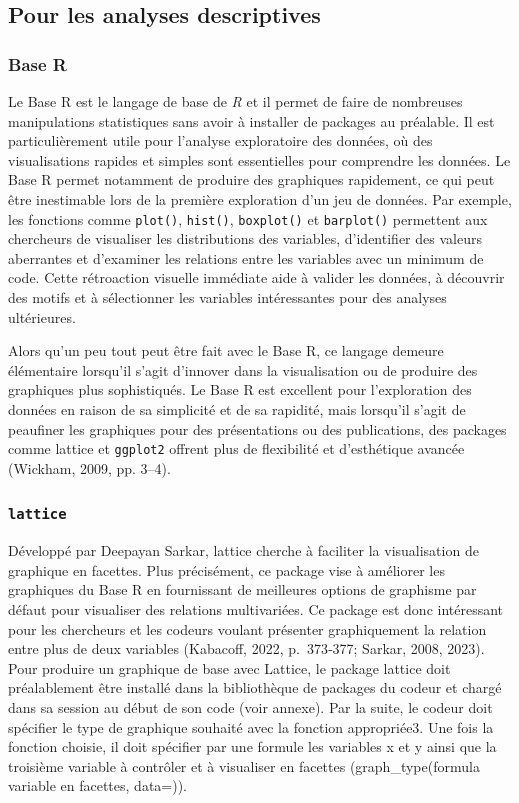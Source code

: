 \documentclass[
  letterpaper,
  DIV=11,
  numbers=noendperiod]{scrreprt}
\begin{document}
\subsection{Pour les analyses
descriptives}\label{pour-les-analyses-descriptives}

\subsubsection{Base R}\label{base-r}

Le Base R est le langage de base de \emph{R} et il permet de faire de
nombreuses manipulations statistiques sans avoir à installer de packages
au préalable. Il est particulièrement utile pour l'analyse exploratoire
des données, où des visualisations rapides et simples sont essentielles
pour comprendre les données. Le Base R permet notamment de produire des
graphiques rapidement, ce qui peut être inestimable lors de la première
exploration d'un jeu de données. Par exemple, les fonctions comme
\texttt{plot()}, \texttt{hist()}, \texttt{boxplot()} et
\texttt{barplot()} permettent aux chercheurs de visualiser les
distributions des variables, d'identifier des valeurs aberrantes et
d'examiner les relations entre les variables avec un minimum de code.
Cette rétroaction visuelle immédiate aide à valider les données, à
découvrir des motifs et à sélectionner les variables intéressantes pour
des analyses ultérieures.

Alors qu'un peu tout peut être fait avec le Base R, ce langage demeure
élémentaire lorsqu'il s'agit d'innover dans la visualisation ou de
produire des graphiques plus sophistiqués. Le Base R est excellent pour
l'exploration des données en raison de sa simplicité et de sa rapidité,
mais lorsqu'il s'agit de peaufiner les graphiques pour des présentations
ou des publications, des packages comme lattice et \texttt{ggplot2}
offrent plus de flexibilité et d'esthétique avancée (Wickham, 2009, pp.
3--4).

\subsubsection{\texorpdfstring{\texttt{lattice}}{lattice}}\label{lattice}

Développé par Deepayan Sarkar, lattice cherche à faciliter la
visualisation de graphique en facettes. Plus précisément, ce package
vise à améliorer les graphiques du Base R en fournissant de meilleures
options de graphisme par défaut pour visualiser des relations
multivariées. Ce package est donc intéressant pour les chercheurs et les
codeurs voulant présenter graphiquement la relation entre plus de deux
variables (Kabacoff, 2022, p.~373‑377; Sarkar, 2008, 2023). Pour
produire un graphique de base avec Lattice, le package lattice doit
préalablement être installé dans la bibliothèque de packages du codeur
et chargé dans sa session au début de son code (voir annexe). Par la
suite, le codeur doit spécifier le type de graphique souhaité avec la
fonction appropriée3. Une fois la fonction choisie, il doit spécifier
par une formule les variables x et y ainsi que la troisième variable à
contrôler et à visualiser en facettes (graph\_type(formula \textbar{}
variable en facettes, data=)).
\end{document}
